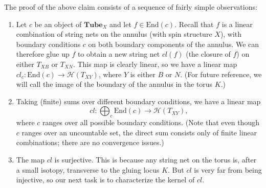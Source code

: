 \documentclass[12pt,a4paper]{article}
\newcommand{\mch}{\mathcal{H}}
\newcommand\be            {\begin{equation}}
\newcommand\ee            {\end{equation}}
\newcommand{\End}{\text{End}}
\newcommand{\tube}{\textbf{Tube}}
\begin{document}
The proof of the above claim consists of a sequence of fairly simple observations:
\begin{enumerate}

\item Let $c$ be an object of $\tube_X$ and let $f\in\End(c)$.
Recall that $f$ is a linear combination of string nets on the annulus (with spin structure $X$), with boundary conditions
$c$ on both boundary components of the annulus.
We can therefore glue up $f$ to obtain a new string net $cl(f)$ (the closure of $f$) on either $T_{XB}$ or $T_{XN}$.
This map is clearly linear, so we have a linear map $cl_c : \End(c) \to \mch(T_{XY})$, where $Y$ is either $B$ or $N$.
(For future reference, we will call the image of the boundary of the annulus in the torus $K$.)

\item Taking (finite) sums over different boundary conditions, we have a linear map
\be
	cl : \bigoplus_c \End(c) \to \mch(T_{XY}) ,
\ee
where $c$ ranges over all possible boundary conditions.
(Note that even though $c$ ranges over an uncountable set, the direct sum consists only of finite linear combinations; 
there are no convergence issues.)

\item The map $cl$ is surjective.
This is because any string net on the torus is, after a small isotopy, 
transverse to the gluing locus $K$.
But $cl$ is very far from being injective, so our next task is to characterize the kernel of $cl$.


\end{enumerate}
\end{document}
